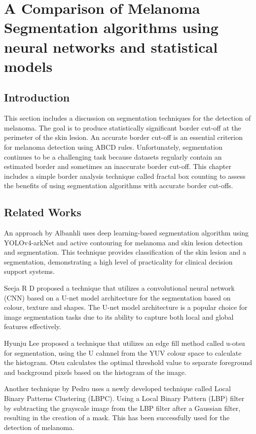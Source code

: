 \chapter{A Comparison of Melanoma Segmentation algorithms using neural networks and statistical models}

\section{Introduction}
This section includes a discussion on segmentation techniques for the detection of melanoma. The goal is to produce statistically significant border cut-off at the perimeter of the skin lesion. An accurate border cut-off is an essential criterion for melanoma detection\cite{Pereira2020, Kaya2016} using ABCD rules. Unfortunately, segmentation continues to be a challenging task because datasets regularly contain an estimated border and sometimes an inaccurate border cut-off. This chapter includes a simple border analysis technique called fractal box counting to assess the benefits of using segmentation algorithms with accurate border cut-offs.

\section{Related Works}
An approach by Albanhli\cite{Albahli2020} uses deep learning-based segmentation algorithm using YOLOv4-arkNet and active contouring for melanoma and skin lesion detection and segmentation. This technique provides classification of the skin lesion and a segmentation, demonstrating a high level of practicality for clinical decision support systems. 

Seeja R D\cite{seeja2019} proposed a technique that utilizes a convolutional neural network (CNN) based on a U-net model architecture for the segmentation based on colour, texture and shapes. The U-net model architecture is a popular choice for image segmentation tasks due to its ability to capture both local and global features effectively.

Hyunju Lee\cite{Lee2020} proposed a technique that utilizes an edge fill method called u-otsu for segmentation, using the U cahnnel from the YUV colour space to calculate the histogram. Otsu calculates the optimal threshold value to separate foreground and background pixels based on the histogram of the image.

Another technique by Pedro\cite{Pereira2020} uses a newly developed technique called Local Binary Patterns Clustering (LBPC). Using a Local Binary Pattern (LBP) filter by subtracting the grayscale image from the LBP filter after a Gaussian filter, resulting in the creation of a mask. This has been successfully used for the detection of melanoma.

